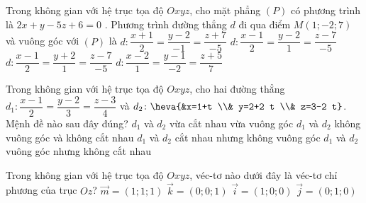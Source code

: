 \begin{ex}%
	Trong không gian với hệ trục tọa độ $O x y z$, cho mặt phẳng $(P)$ có phương trình là $2 x+y-5 z+6=0$ . Phương trình đường thẳng $d$ đi qua điểm $M(1 ;-2 ; 7)$ và  vuông góc với $(P)$ là
	\choice
	{$d\colon  \dfrac{x+1}{2}=\dfrac{y-2}{-1}=\dfrac{z+7}{-5}$}
	{$d\colon  \dfrac{x-1}{2}=\dfrac{y-2}{1}=\dfrac{z-7}{-5}$}
	{\True $d\colon  \dfrac{x-1}{2}=\dfrac{y+2}{1}=\dfrac{z-7}{-5}$}
	{$d\colon  \dfrac{x-2}{1}=\dfrac{y-1}{-2}=\dfrac{z+5}{7}$}
\end{ex}

\begin{ex}%
	Trong không gian với hệ trục tọa độ $O x y z$, cho hai đường thẳng $d_1\colon \dfrac{x-1}{2}=\dfrac{y-2}{3}=\dfrac{z-3}{4}$ và $d_2\colon\heva{&x=1+t \\& y=2+2 t \\& z=3-2 t}$. Mệnh đề nào sau đây đúng?
	\choice
	{\True $d_1$ và $d_2$  vừa cắt nhau vừa vuông góc}
	{$d_1$ và $d_2$ không vuông góc và không cắt nhau}
	{$d_1$ và $d_2$ cắt nhau nhưng không vuông góc}
	{$d_1$ và $d_2$ vuông góc nhưng không cắt nhau}
\end{ex}

\begin{ex}%
	Trong không gian với hệ trục tọa độ $Oxyz$, véc-tơ nào dưới đây là véc-tơ chỉ phương của trục $Oz$?
	\choice
	{$\overrightarrow{m}=(1 ; 1 ; 1)$}
	{\True $\overrightarrow{k}=(0 ; 0 ; 1)$}
	{$\overrightarrow{i}=(1 ; 0 ; 0)$}
	{$\overrightarrow{j}=(0 ; 1 ; 0)$}
\end{ex}

